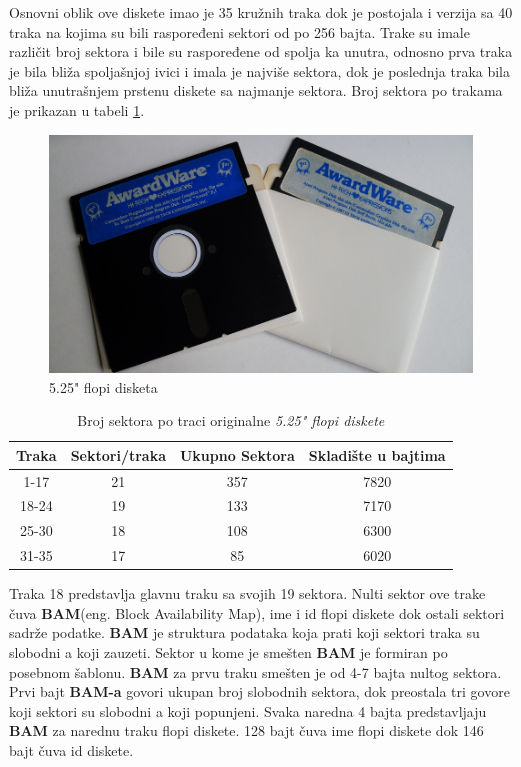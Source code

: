 Osnovni oblik ove diskete imao je 35 kružnih traka dok je postojala i verzija sa 40 traka na kojima su bili raspoređeni sektori od po 256 bajta. Trake su imale različit broj sektora i bile su raspoređene od spolja ka unutra, odnosno prva traka je bila bliža spoljašnjoj ivici i imala je najviše sektora, dok je poslednja traka bila bliža unutrašnjem prstenu diskete sa najmanje sektora. Broj sektora po trakama je prikazan u tabeli \ref{tab:sektor_traka}.

\begin{figure}[ht]
\begin{center}
\includegraphics[width=\textwidth]{img/Flopi.jpg}
\caption[5.25" flopi disketa \textit{(preuzeto \cite{Flopi})}]{5.25" flopi disketa}
\label{img:flopi}
\end{center}
\end{figure}

\begin{table}[h!]
\begin{center}
\begin{tabular}{ | c | c| c | c | } 
\hline
Traka & Sektori/traka & Ukupno Sektora & Skladište u bajtima \\
\hline
\hline
1-17 & 21 & 357 & 7820 \\
\hline
18-24 & 19 & 133 & 7170 \\
\hline
25-30 & 18 & 108 & 6300 \\
\hline
31-35 & 17 & 85 & 6020 \\
\hline
\end{tabular}
\end{center}
\caption{Broj sektora po traci originalne \textit{5.25" flopi diskete}}
\label{tab:sektor_traka}
\end{table}

Traka 18 predstavlja glavnu traku sa svojih 19 sektora. Nulti sektor ove trake čuva \textbf{BAM}(eng. Block Availability Map), ime i id flopi diskete dok ostali sektori sadrže podatke. \textbf{BAM} je struktura podataka koja prati koji sektori traka su slobodni a koji zauzeti. Sektor u kome je smešten \textbf{BAM} je formiran po posebnom šablonu. \textbf{BAM} za prvu traku smešten je od 4-7 bajta nultog sektora. Prvi bajt \textbf{BAM-a} govori ukupan broj slobodnih sektora, dok preostala tri govore koji sektori su slobodni a koji popunjeni. Svaka naredna 4 bajta predstavljaju \textbf{BAM} za narednu traku flopi diskete. 128 bajt čuva ime flopi diskete dok 146 bajt čuva id diskete.

